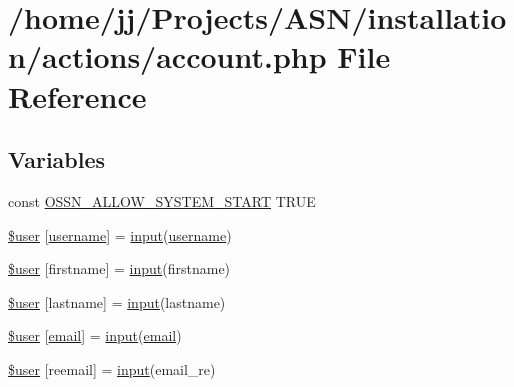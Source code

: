 \hypertarget{actions_2account_8php}{}\section{/home/jj/\+Projects/\+A\+S\+N/installation/actions/account.php File Reference}
\label{actions_2account_8php}
\subsection*{Variables}
\begin{DoxyCompactItemize}
\item 
const \hyperlink{actions_2account_8php_a73aeae1243c8451cb328ddfe84637175}{O\+S\+S\+N\+\_\+\+A\+L\+L\+O\+W\+\_\+\+S\+Y\+S\+T\+E\+M\+\_\+\+S\+T\+A\+RT} T\+R\+UE
\item 
\hyperlink{actions_2account_8php_a48c184d1487bdbc0b0d2fe6e1521dd7d}{\$user} \mbox{[}\textquotesingle{}\hyperlink{actions_2account_8php_ac9b3768ccc688c2ff0811c50c107a02e}{username}\textquotesingle{}\mbox{]} = \hyperlink{ossn_8lib_8input_8php_a64ebee98b041c4f75f71ed3cd73cc8ed}{input}(\textquotesingle{}\hyperlink{actions_2account_8php_ac9b3768ccc688c2ff0811c50c107a02e}{username}\textquotesingle{})
\item 
\hyperlink{actions_2account_8php_a3c8ba9ea696968574370c51a90ff638c}{\$user} \mbox{[}\textquotesingle{}firstname\textquotesingle{}\mbox{]} = \hyperlink{ossn_8lib_8input_8php_a64ebee98b041c4f75f71ed3cd73cc8ed}{input}(\textquotesingle{}firstname\textquotesingle{})
\item 
\hyperlink{actions_2account_8php_a1187774c6d9942181216e0839e5e73bc}{\$user} \mbox{[}\textquotesingle{}lastname\textquotesingle{}\mbox{]} = \hyperlink{ossn_8lib_8input_8php_a64ebee98b041c4f75f71ed3cd73cc8ed}{input}(\textquotesingle{}lastname\textquotesingle{})
\item 
\hyperlink{actions_2account_8php_ae9de5cc5ae3fec81bb110d3a77ad7eec}{\$user} \mbox{[}\textquotesingle{}\hyperlink{actions_2account_8php_a011c66ae212438e0d7de7c0e40451bb3}{email}\textquotesingle{}\mbox{]} = \hyperlink{ossn_8lib_8input_8php_a64ebee98b041c4f75f71ed3cd73cc8ed}{input}(\textquotesingle{}\hyperlink{actions_2account_8php_a011c66ae212438e0d7de7c0e40451bb3}{email}\textquotesingle{})
\item 
\hyperlink{actions_2account_8php_a51e0459c93e600b4959a74463028a5e1}{\$user} \mbox{[}\textquotesingle{}reemail\textquotesingle{}\mbox{]} = \hyperlink{ossn_8lib_8input_8php_a64ebee98b041c4f75f71ed3cd73cc8ed}{input}(\textquotesingle{}email\+\_\+re\textquotesingle{})

\end{DoxyCompactItemize}

